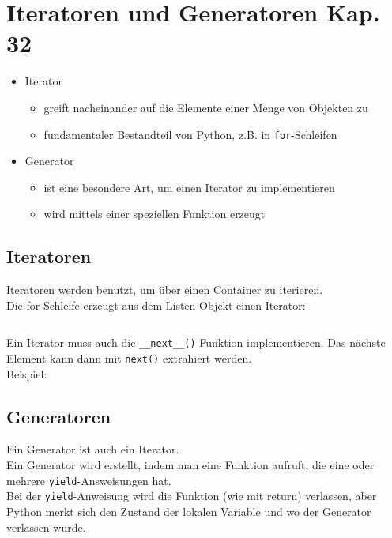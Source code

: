 \section[Iteratoren und Generatoren]{Iteratoren und Generatoren \tiny{Kap. 32}}
\begin{itemize}
	\item Iterator
	\begin{itemize}
		\item greift nacheinander auf die Elemente einer Menge von Objekten zu
		\item fundamentaler Bestandteil von Python, z.B. in \texttt{for}-Schleifen
	\end{itemize}
	\item Generator
	\begin{itemize}
		\item ist eine besondere Art, um einen Iterator zu implementieren
		\item wird mittels einer speziellen Funktion erzeugt
	\end{itemize}
\end{itemize}

\begin{minipage}[t]{0.59\textwidth}
	\subsection{Iteratoren}
	Iteratoren werden benutzt, um über einen Container zu iterieren.\\
	Die for-Schleife erzeugt aus dem Listen-Objekt einen Iterator:
\end{minipage}
\begin{minipage}[t]{0.02\textwidth} $ \quad $\end{minipage}
\begin{minipage}[t]{0.39\textwidth}
	
\end{minipage}

Ein Iterator muss auch die \texttt{\_\_next\_\_()}-Funktion implementieren. Das nächste Element kann dann mit \texttt{next()} extrahiert werden.\\
Beispiel:


\begin{minipage}[t]{0.44\textwidth}
	\subsection{Generatoren}
	Ein Generator ist auch ein Iterator.\\
	Ein Generator wird erstellt, indem man eine Funktion aufruft, die eine oder mehrere \texttt{yield}-Answeisungen hat.\\
	Bei der \texttt{yield}-Anweisung wird die Funktion (wie mit return) verlassen, aber Python merkt sich den Zustand der lokalen Variable und wo der Generator verlassen wurde.
\end{minipage}
\begin{minipage}[t]{0.02\textwidth} $ \quad $\end{minipage}
\begin{minipage}[t]{0.54\textwidth}
	
\end{minipage}

